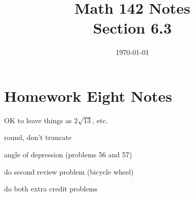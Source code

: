\documentclass{exam}
\title{Math 142 Notes \\ Section 6.3}
\date{\today}
\begin{document}
  \maketitle
  \tableofcontents

  \section{Homework Eight Notes}
  \begin{itemize*}
    \item OK to leave things as $2 \sqrt{13}$, etc.
    \item round, don't truncate
    \item angle of depression (problems 56 and 57)
    \item do second review problem (bicycle wheel)
    \item do both extra credit problems
  \end{itemize*}
\end{document}
